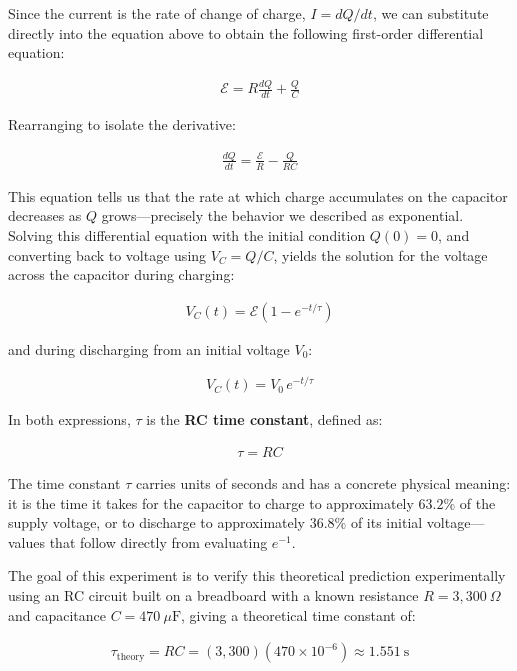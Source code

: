 \documentclass[12pt]{article}
\begin{document}
\noindent Since the current is the rate of change of charge, $I = dQ/dt$, 
we can substitute directly into the equation above to obtain the following 
first-order differential equation:

\begin{align*}
    \mathcal{E} = R\frac{dQ}{dt} + \frac{Q}{C}
\end{align*}

\noindent Rearranging to isolate the derivative:

\begin{align*}
    \frac{dQ}{dt} = \frac{\mathcal{E}}{R} - \frac{Q}{RC}
\end{align*}

\noindent This equation tells us that the rate at which charge accumulates 
on the capacitor decreases as $Q$ grows---precisely the behavior we 
described as exponential. Solving this differential equation with the 
initial condition $Q(0) = 0$, and converting back to voltage using 
$V_C = Q/C$, yields the solution for the voltage across the capacitor 
during charging:

\begin{align*}
    V_C(t) = \mathcal{E}\left(1 - e^{-t/\tau}\right)
\end{align*}

\noindent and during discharging from an initial voltage $V_0$:

\begin{align*}
    V_C(t) = V_0\, e^{-t/\tau}
\end{align*}

\noindent In both expressions, $\tau$ is the \textbf{RC time constant}, 
defined as:

\begin{align*}
    \tau = RC
\end{align*}

\noindent The time constant $\tau$ carries units of seconds and has a concrete 
physical meaning: it is the time it takes for the capacitor to charge to 
approximately $63.2\%$ of the supply voltage, or to discharge to approximately 
$36.8\%$ of its initial voltage---values that follow directly from evaluating 
$e^{-1}$.

The goal of this experiment is to verify this theoretical prediction 
experimentally using an RC circuit built on a breadboard with a known 
resistance $R = 3{,}300\ \Omega$ and capacitance $C = 470\ \mu\text{F}$, 
giving a theoretical time constant of:

\begin{align*}
    \tau_{\text{theory}} = RC = (3{,}300)(470 \times 10^{-6}) \approx 1.551\ 
    \text{s}
\end{align*}
\end{document}
